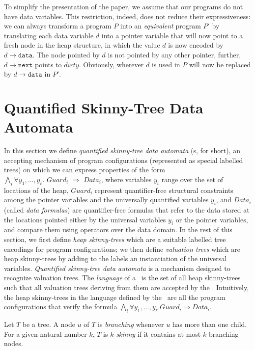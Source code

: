 \documentclass{llncs}
\newcommand{\next}{\texttt{next}}
\newcommand{\data}{\texttt{data}}
\newcommand{\dirty}{\mathit{dirty}}
\begin{document}
To simplify the presentation of the paper, we assume that our programs do not have data variables. This restriction, indeed, does not reduce their expressiveness: we can always transform a program $P$ into an {\em equivalent} program $P'$ by translating each data variable $d$ into a pointer variable that will now point to a fresh node in the heap structure, in  which the value $d$ is now encoded by $d\rightarrow\data$. The node pointed by $d$ is not pointed by any other pointer, further, $d\rightarrow\next$ points to $\dirty$. Obviously, wherever $d$ is used in $P$ will now be replaced by $d\rightarrow\data$ in $P'$. 







\section{Quantified Skinny-Tree Data Automata} \label{sec:qda}
In this section we define {\em quantified skinny-tree data automata} (\QSDA s, for short), an accepting  mechanism  of program configurations (represented as special labelled trees) on which we can express properties of the form \\
$\bigwedge_i \forall y_1,\ldots,y_\ell.$ $Guard_i$ $\Rightarrow$ $Data_i$,
where variables $y_i$ range over the set of locations of the heap, $Guard_i$ represent quantifier-free structural constraints among the pointer variables and the universally quantified variables $y_i$, and $Data_i$ (called {\em data formulas}) are quantifier-free formulas that refer to the data stored at the locations pointed either by the universal variables $y_i$ or the pointer variables, and compare them using operators over the data domain.  In the rest of this section, we first define {\em heap skinny-trees} which are a suitable labelled tree encodings for program configurations; we then define {\em valuation trees} which are heap skinny-trees by adding to the labels an instantiation of the universal variables. {\em Quantified skinny-tree data automata} is a mechanism designed to recognize valuation trees. The {\em language} of a \QSDA\ is the set of all heap skinny-trees such that all valuation trees deriving from them are accepted by the \QSDA. Intuitively, the heap skinny-trees in the language defined by the \QSDA\ are all the program configurations that verify the formula $\bigwedge_i \forall y_1,\ldots,y_\ell. Guard_i \Rightarrow Data_i$.


Let $T$ be a tree. A node $u$ of $T$ is {\em branching} whenever $u$ has more than one child. For a given natural number $k$, $T$  is  $k$-{\em skinny} if it contains at most $k$ branching nodes.
\end{document}
